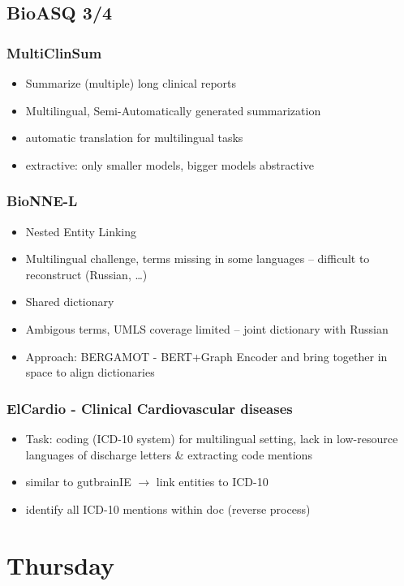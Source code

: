 \documentclass[a4paper]{article}
\begin{document}
\subsection{BioASQ 3/4}
\subsubsection{MultiClinSum}
\begin{itemize}
    \item Summarize (multiple) long clinical reports
    \item Multilingual, Semi-Automatically generated summarization
    \item automatic translation for multilingual tasks
    \item extractive: only smaller models, bigger models abstractive
\end{itemize}
\subsubsection{BioNNE-L}
\begin{itemize}
    \item Nested Entity Linking
    \item Multilingual challenge, terms missing in some languages -- difficult to reconstruct (Russian, \dots)
    \item Shared dictionary
    \item Ambigous terms, UMLS coverage limited -- joint dictionary with Russian
    \item Approach: BERGAMOT - BERT+Graph Encoder and bring together in space to align dictionaries
\end{itemize}
\subsubsection{ElCardio - Clinical Cardiovascular diseases}
\begin{itemize}
    \item Task: coding (ICD-10 system) for multilingual setting, lack in low-resource languages of discharge letters \& extracting code mentions
    \item similar to gutbrainIE $\rightarrow$ link entities to ICD-10
    \item identify all ICD-10 mentions within doc (reverse process)
\end{itemize}
\section{Thursday}
\end{document}
